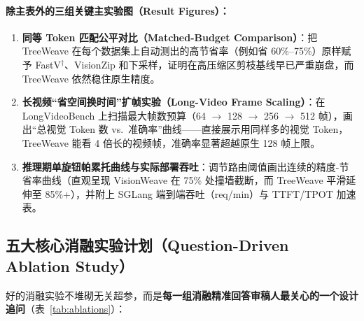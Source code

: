 \documentclass[11pt,a4paper]{ctexart}
\begin{document}
\paragraph{除主表外的三组关键主实验图（Result Figures）：}
\begin{enumerate}[leftmargin=1.6em, itemsep=3pt]
  \item \textbf{同等 Token 匹配公平对比（Matched-Budget Comparison）}：把 TreeWeave 在每个数据集上自动测出的高节省率（例如省 60\%--75\%）原样赋予 FastV$^\dagger$、VisionZip 和下采样，证明在高压缩区剪枝基线早已严重崩盘，而 TreeWeave 依然稳住原生精度。
  \item \textbf{长视频``省空间换时间''扩帧实验（Long-Video Frame Scaling）}：在 LongVideoBench 上扫描最大帧数预算（64 $\to$ 128 $\to$ 256 $\to$ 512 帧），画出``总视觉 Token 数 vs.\ 准确率''曲线——直接展示用同样多的视觉 Token，TreeWeave 能看 4 倍长的视频帧，准确率显著超越原生 128 帧上限。
  \item \textbf{推理期单旋钮帕累托曲线与实际部署吞吐}：调节路由阈值画出连续的精度-节省率曲线（直观呈现 VisionWeave 在 75\% 处撞墙截断，而 TreeWeave 平滑延伸至 85\%+），并附上 SGLang 端到端吞吐（req/min）与 TTFT/TPOT 加速表。
\end{enumerate}

\subsection{五大核心消融实验计划（Question-Driven Ablation Study）}

好的消融实验不堆砌无关超参，而是\textbf{每一组消融精准回答审稿人最关心的一个设计追问}（表~\ref{tab:ablations}）：
\end{document}
